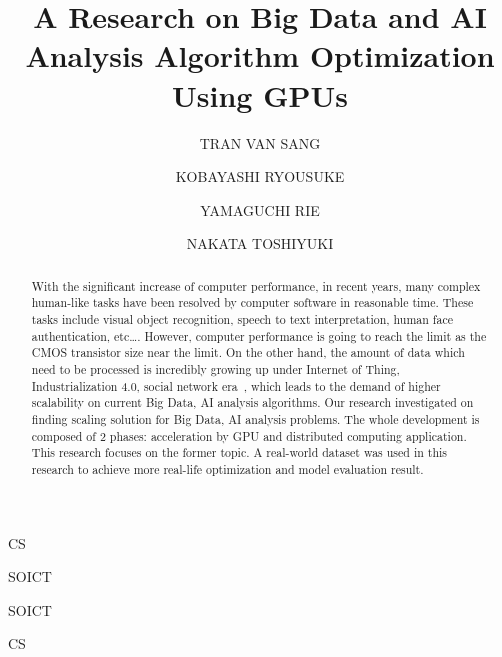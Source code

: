 \documentclass[English]{dicomopapers}
\begin{document}
\title{A Research on Big Data and AI Analysis Algorithm Optimization Using GPUs}


\author{TRAN VAN SANG}{CS}
\author{KOBAYASHI RYOUSUKE}{SOICT}
\author{YAMAGUCHI RIE}{SOICT}
\author{NAKATA TOSHIYUKI}{CS}

\begin{abstract}
With the significant increase of computer performance, in recent years, many complex human-like tasks have been resolved by computer software in reasonable time. These tasks include visual object recognition, speech to text interpretation, human face authentication, etc\ldots. However, computer performance is going to reach the limit as the CMOS transistor size near the limit. On the other hand, the amount of data which need to be processed is incredibly growing up under Internet of Thing, Industrialization 4.0, social network era~\cite{lohr2012age}, which leads to the demand of higher scalability on current Big Data, AI analysis algorithms. Our research investigated on finding scaling solution for Big Data, AI analysis problems. The whole development is composed of 2 phases: acceleration by GPU and distributed computing application. This research focuses on the former topic. A real-world dataset was used in this research to achieve more real-life optimization and model evaluation result.
\end{abstract}

\maketitle

\end{document}
